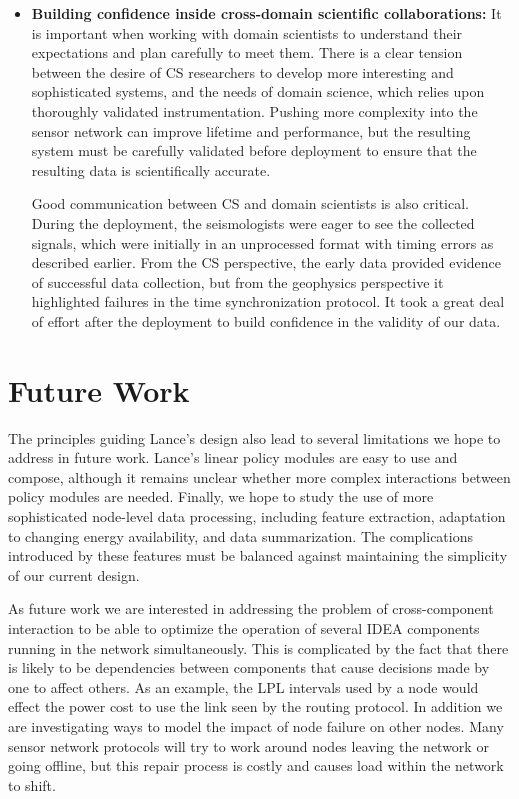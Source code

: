 \begin{itemize}
\item \textbf{Building confidence inside cross-domain scientific
collaborations:} It is important when working with domain scientists to
understand their expectations and plan carefully to meet them. There is a
clear tension between the desire of CS researchers to develop more
interesting and sophisticated systems, and the needs of domain science, which
relies upon thoroughly validated instrumentation. Pushing more complexity
into the sensor network can improve lifetime and performance, but the
resulting system must be carefully validated before deployment to ensure that
the resulting data is scientifically accurate.

Good communication between CS and domain scientists is also critical.  During
the deployment, the seismologists were eager to see the collected signals,
which were initially in an unprocessed format with timing errors as described
earlier. From the CS perspective, the early data provided evidence of
successful data collection, but from the geophysics perspective it
highlighted failures in the time synchronization protocol. It took a great
deal of effort after the deployment to build confidence in the validity of
our data.

\end{itemize}

\section{Future Work}


The principles guiding Lance's design also lead to several limitations we
hope to address in future work.  Lance's linear policy modules are easy to
use and compose, although it remains unclear whether more complex
interactions between policy modules are needed. Finally, we hope to study the
use of more sophisticated node-level data processing, including feature
extraction, adaptation to changing energy availability, and data
summarization.  The complications introduced by these features must be
balanced against maintaining the simplicity of our current design.


As future work we are interested in addressing the problem of cross-component
interaction to be able to optimize the operation of several IDEA components
running in the network simultaneously. This is complicated by the fact that
there is likely to be dependencies between components that cause decisions
made by one to affect others. As an example, the LPL intervals used by a node
would effect the power cost to use the link seen by the routing protocol.  In
addition we are investigating ways to model the impact of node failure on
other nodes. Many sensor network protocols will try to work around nodes
leaving the network or going offline, but this repair process is costly and
causes load within the network to shift.

